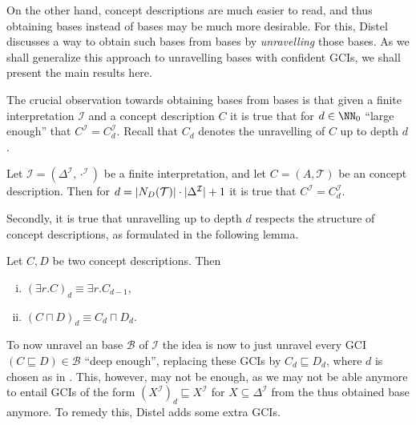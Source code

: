 On the other hand, \ELbot concept descriptions are much easier to read, and thus obtaining
\ELbot bases instead of \ELgfpbot bases may be much more desirable.  For this, Distel
discusses a way to obtain such \ELbot bases from \ELgfpbot bases by \emph{unravelling}
those bases.  As we shall generalize this approach to unravelling \ELgfpbot bases with
confident GCIs, we shall present the main results here.

The crucial observation towards obtaining \ELbot bases from \ELgfpbot bases is that given
a finite interpretation $\mathcal{I}$ and a concept description $C$ it is true that for $d
\in \NN_0$ ``large enough'' that $C^{\mathcal{I}} = C_d^{\mathcal{I}}$.  Recall that $C_d$
denotes the unravelling of $C$ up to depth $d$.

\begin{Lemma}
  \label{lem:Felix-lemma-5.5}
  Let $\mathcal{I} = (\Delta^{\mathcal{I}}, \cdot^{\mathcal{I}})$ be a finite
  interpretation, and let $C = (A, \mathcal{T})$ be an \ELgfp concept description.
  Then for $d = \lvert N_D(\mathcal{T}) \rvert \cdot \lvert \Delta^{\mathcal{I}} \rvert + 1$ it is
  true that $C^{\mathcal{I}} = C_d^{\mathcal{I}}$.
\end{Lemma}

Secondly, it is true that unravelling up to depth $d$ respects the structure of \ELbot
concept descriptions, as formulated in the following lemma.

\begin{Lemma}
  \label{lem:unravelling-is-homomorphism}
  Let $C, D$ be two \ELgfp concept descriptions.  Then
  \begin{enumerate}[i. ]
  \item $(\exists r. C)_d \equiv \exists r. C_{d-1}$,
  \item $(C \sqcap D)_d \equiv C_d \sqcap D_d$.
  \end{enumerate}
\end{Lemma}

To now unravel an \ELgfpbot base $\mathcal{B}$ of $\mathcal{I}$ the idea is now to just
unravel every GCI $(C \sqsubseteq D) \in \mathcal{B}$ ``deep enough'', \ie replacing these
GCIs by $C_d \sqsubseteq D_d$, where $d$ is chosen as in .
This, however, may not be enough, as we may not be able anymore to entail GCIs of the form
$(X^{\mathcal{I}})_d \sqsubseteq X^{\mathcal{I}}$ for $X \subseteq \Delta^{\mathcal{I}}$
from the thus obtained base anymore.  To remedy this, Distel adds some extra GCIs.

